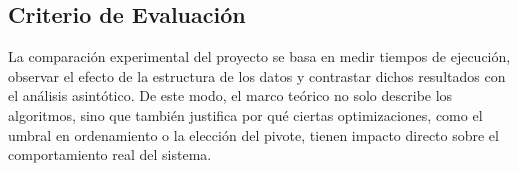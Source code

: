 \subsection{Criterio de Evaluación}
La comparación experimental del proyecto se basa en medir tiempos de ejecución, observar el efecto de la estructura de los datos y contrastar dichos resultados con el análisis asintótico. De este modo, el marco teórico no solo describe los algoritmos, sino que también justifica por qué ciertas optimizaciones, como el umbral en ordenamiento o la elección del pivote, tienen impacto directo sobre el comportamiento real del sistema.